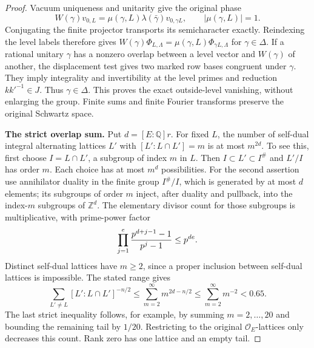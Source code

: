 \begin{proof}
Vacuum uniqueness and unitarity give the original phase
\[
 W(\gamma)v_{0,L}=\mu(\gamma,L)\lambda(\bar\gamma)
                          v_{0,\gamma L},\qquad |\mu(\gamma,L)|=1.
\]
Conjugating the finite projector transports its semicharacter
exactly. Reindexing the level labels therefore gives
$W(\gamma)\Phi_{L,\Lambda}=\mu(\gamma,L)\Phi_{\gamma L,\Lambda}$
for $\gamma\in\Delta$. If a rational unitary $\gamma$ has a
nonzero overlap between a level vector and $W(\gamma)$ of another,
the displacement test gives two marked row bases congruent under
$\gamma$. They imply integrality and invertibility at the level
primes and reduction $kk'^{-1}\in J$. Thus $\gamma\in\Delta$.
This proves the exact outside-level vanishing, without enlarging
the group. Finite sums and finite Fourier transforms preserve
the original Schwartz space.

\textbf{The strict overlap sum.}
Put $d=[E:\mathbb Q]r$. For fixed $L$, the number of self-dual
integral alternating lattices $L'$ with $[L':L\cap L']=m$ is at
most $m^{2d}$. To see this, first choose $I=L\cap L'$, a subgroup
of index $m$ in $L$. Then $I\subset L'\subset I^\#$ and
$L'/I$ has order $m$. Each choice has at most $m^d$ possibilities.
For the second assertion use annihilator duality in the finite
group $I^\#/I$, which is generated by at most $d$ elements; its
subgroups of order $m$ inject, after duality and pullback, into
the index-$m$ subgroups of $\mathbb Z^d$. The elementary divisor
count for those subgroups is multiplicative, with prime-power
factor
\[
 \prod_{j=1}^e{p^{d+j-1}-1\over p^j-1}\le p^{de}.
\]
Distinct self-dual lattices have $m\ge2$, since a proper inclusion
between self-dual lattices is impossible. The stated range gives
\[
 \sum_{L'\ne L}[L':L\cap L']^{-n/2}
 \le\sum_{m=2}^{\infty}m^{2d-n/2}
 \le\sum_{m=2}^{\infty}m^{-2}<0.65.
\]
The last strict inequality follows, for example, by summing
$m=2,\ldots,20$ and bounding the remaining tail by $1/20$.
Restricting to the original $\mathcal O_E$-lattices only decreases
this count. Rank zero has one lattice and an empty tail.


\end{proof}
